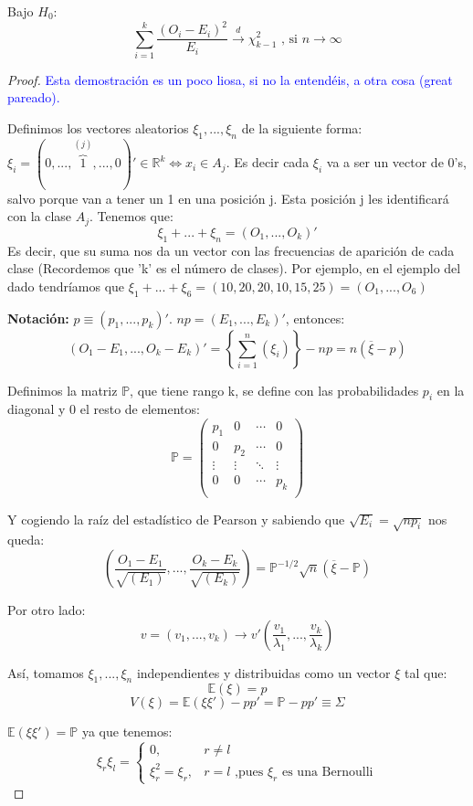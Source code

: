 \documentclass[palatino,nochap]{apuntes}
\begin{document}
\begin{theorem}
Bajo $H_0$:
\[
\sum_{i=1}^k \frac{(O_i-E_i)^2}{E_i} \stackrel{d}{\rightarrow} \chi^2_{k-1} \text{ , si } n \rightarrow \infty
\]
\end{theorem}
\begin{proof}
\textcolor{blue}{Esta demostración es un poco liosa, si no la entendéis, a otra cosa (great pareado).}

Definimos los vectores aleatorios $\xi_1,...,\xi_n$ de la siguiente forma: $\xi_i=(0,...,\overbrace{1}^{(j)},...,0)' \in \mathbb{R}^k \Leftrightarrow x_i \in A_j$. Es decir cada $\xi_i$ va a ser un vector de 0's, salvo porque van a tener un 1 en una posición j. Esta posición j les identificará con la clase $A_j$. Tenemos que:
\[
\xi_1+...+\xi_n=(O_1,...,O_k)'
\]
Es decir, que su suma nos da un vector con las frecuencias de aparición de cada clase (Recordemos que 'k' es el número de clases). Por ejemplo, en el ejemplo del dado tendríamos que $\xi_1+...+\xi_6=(10,20,20,10,15,25)=(O_1,...,O_6)$

\textbf{Notación: } $p\equiv (p_1,...,p_k)'$. $np=(E_1,...,E_k)'$, entonces:
\[
(O_1-E_1,...,O_k-E_k)'=\left\{\sum_{i=1}^n(\xi_i)\right\}-np=n(\overline{\xi}-p)
\]

Definimos la matriz $\mathbb{P}$, que tiene rango k, se define con las probabilidades $p_i$ en la diagonal y 0 el resto de elementos:
\[
\mathbb{P}=\left(
\begin{array}{cccc}
p_1    & 0      & \cdots & 0 \\
0      & p_2    & \cdots & 0 \\
\vdots & \vdots & \ddots & \vdots \\
0      & 0      & \cdots & p_k \\
\end{array}
\right)
\]

Y cogiendo la raíz del estadístico de Pearson y sabiendo que $\sqrt{E_i}=\sqrt{np_i}$ nos queda:
\[
\left(\frac{O_1-E_1}{\sqrt{(E_1)}},...,\frac{O_k-E_k}{\sqrt{(E_k)}}  \right) = \mathbb{P}^{-1/2}\sqrt{n} (\overline{\xi}-\mathbb{P})
\]

Por otro lado: 
\[
v=(v_1,...,v_k) \rightarrow v'(\frac{v_1}{\lambda_1},...,\frac{v_k}{\lambda_k})
\]

Así, tomamos $\xi_1,...,\xi_n$ independientes y distribuidas como un vector $\xi$ tal que:
\[
\mathbb{E}(\xi)=p
\]
\[
V(\xi)=\mathbb{E}(\xi \xi') -pp' = \mathbb{P}-pp' \equiv \Sigma 
\]

$\mathbb{E}(\xi\xi')=\mathbb{P}$ ya que tenemos:
\[	ξ_r ξ_l =
	\begin{cases}
		0, & r≠l \\
		ξ_r^2 = ξ_r, & r=l \text{ ,pues } ξ_r \text{ es una Bernoulli}
	\end{cases}
\]


\end{proof}
\end{document}
